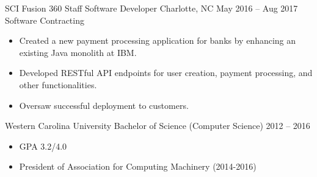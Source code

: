 \documentclass[10pt, a4paper]{cvhari}
\begin{document}
    \smallskip
    \divider
    \smallskip

    \company
        {SCI Fusion 360}
        {Staff Software Developer}
        {Charlotte, NC}
        {May 2016 -- Aug 2017}
        {Software Contracting}
        
        \begin{itemize}
            \item Created a new payment processing application for banks by enhancing an existing Java monolith at IBM. \smallskip
            \item Developed RESTful API endpoints for user creation, payment processing, and other functionalities.\smallskip
            \item Oversaw successful deployment to customers.\medskip
        \end{itemize}
    \medskip

    \medskip
    \education
        {Western Carolina University}
        {Bachelor of Science (Computer Science)}
        {2012 -- 2016}
        \par
        \smallskip
        \begin{itemize}
            \item GPA 3.2/4.0
            \item President of Association for Computing Machinery (2014-2016)
        \end{itemize}
\end{document}
